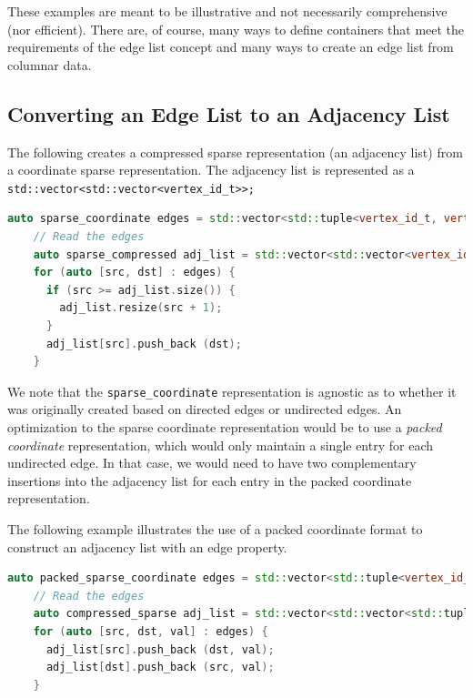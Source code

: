 These examples are meant to be illustrative and not necessarily
comprehensive (nor efficient).
There are, of course, many ways to define containers that meet the
requirements of the edge list concept and many ways to
create an edge list from columnar data.

\subsection{Converting an Edge List to an Adjacency List}

The following creates a compressed sparse representation (an adjacency list) from a coordinate sparse representation.  The adjacency list is represented as 
a \lstinline{std::vector<std::vector<vertex_id_t>>;}
\begin{lstlisting}[language=C++]
    auto sparse_coordinate edges = std::vector<std::tuple<vertex_id_t, vertex_id_t>;
    // Read the edges
    auto sparse_compressed adj_list = std::vector<std::vector<vertex_id_t>>;
    for (auto [src, dst] : edges) {
      if (src >= adj_list.size()) {
        adj_list.resize(src + 1);
      }
      adj_list[src].push_back (dst);
    }
\end{lstlisting}

We note that the \lstinline{sparse_coordinate} representation is agnostic as to whether it was originally created based on directed edges or undirected edges.  An optimization to the sparse coordinate representation would be to use a \emph{packed coordinate} representation, which would only maintain a single entry for each undirected edge.  In that case, we would need to have two complementary insertions into the adjacency list for each entry in the packed coordinate representation.

The following example illustrates the use of a packed coordinate format to construct an adjacency list with an edge property.
\begin{lstlisting}[language=C++]
    auto packed_sparse_coordinate edges = std::vector<std::tuple<vertex_id_t, vertex_id_t, double>>;
    // Read the edges
    auto compressed_sparse adj_list = std::vector<std::vector<std::tuple<vertex_id_t, double>>>(edges.num_vertices();
    for (auto [src, dst, val] : edges) {
      adj_list[src].push_back (dst, val);
      adj_list[dst].push_back (src, val);
    }
 \end{lstlisting}
